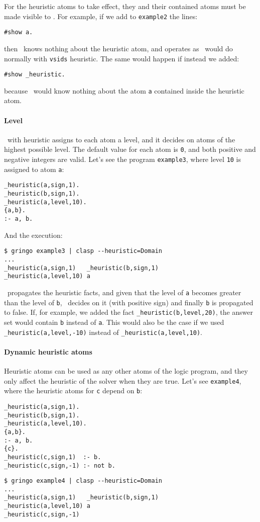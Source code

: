 For the heuristic atoms to take effect, they and their contained atoms must be  made visible to \clasp. For example, if we add to \texttt{example2} the lines:
\begin{lstlisting}[numbers=none]
#show a.
\end{lstlisting}
then \clasp\ knows nothing about the heuristic atom, and operates as \clasp\ would do normally with \texttt{vsids} heuristic. The same would happen if instead we added:
\begin{lstlisting}[numbers=none]
#show _heuristic.
\end{lstlisting}
 because \clasp\ would know nothing about the atom \texttt{a} contained inside the heuristic atom.

\paragraph{Level}
\clasp\ with heuristic  assigns to each atom a level, and it decides on atoms of the highest possible level.
The default value for each atom is \texttt{0},  and both positive and negative integers are valid.
Let's see the program \texttt{example3}, where level \texttt{10} is assigned to atom \texttt{a}:
\begin{lstlisting}[numbers=none]
_heuristic(a,sign,1).
_heuristic(b,sign,1).
_heuristic(a,level,10).
{a,b}.
:- a, b.
\end{lstlisting}
And the execution:
\begin{lstlisting}[numbers=none]
$ gringo example3 | clasp --heuristic=Domain
...
_heuristic(a,sign,1)   _heuristic(b,sign,1)
_heuristic(a,level,10) a\end{lstlisting}

\clasp\ propagates the heuristic facts, and given that the level of \texttt{a} becomes greater than the level of \texttt{b},
\clasp\ decides on it (with positive sign) and finally \texttt{b} is propagated to false.
If, for example, we added the fact \texttt{\_heuristic(b,level,20)},  the answer set would contain \texttt{b} instead of \texttt{a}.
This would also be the case if we used \texttt{\_heuristic(a,level,-10)} instead of \texttt{\_heuristic(a,level,10)}.

\paragraph{Dynamic heuristic atoms}

Heuristic atoms can be used as any other atoms of the logic program,
and they only affect the heuristic of the solver when they are true.
Let's see \texttt{example4}, where the heuristic atoms for \texttt{c} depend on \texttt{b}:
\begin{lstlisting}[numbers=none]
_heuristic(a,sign,1).
_heuristic(b,sign,1).
_heuristic(a,level,10).
{a,b}.
:- a, b.
{c}.
_heuristic(c,sign,1)  :- b.
_heuristic(c,sign,-1) :- not b.
\end{lstlisting}
\begin{lstlisting}[numbers=none]
$ gringo example4 | clasp --heuristic=Domain
...
_heuristic(a,sign,1)   _heuristic(b,sign,1)
_heuristic(a,level,10) a
_heuristic(c,sign,-1)\end{lstlisting}

